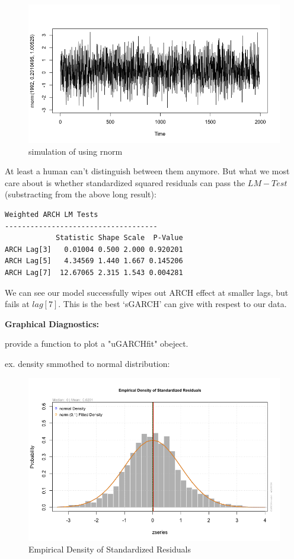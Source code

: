\documentclass[a4paper, 11pt]{article}
\begin{document}
\begin{figure}[H]
\centering
\caption{simulation of using rnorm}
\includegraphics[scale=.40]{rnorm.png}
\end{figure}

\indent At least a human can't distinguish between them anymore. But what we most care about is whether standardized squared residuals can pass the $LM-Test$(substracting from the above long result):

\begin{verbatim}
Weighted ARCH LM Tests
------------------------------------
            Statistic Shape Scale  P-Value
ARCH Lag[3]   0.01004 0.500 2.000 0.920201
ARCH Lag[5]   4.34569 1.440 1.667 0.145206
ARCH Lag[7]  12.67065 2.315 1.543 0.004281
\end{verbatim}

We can see our model successfully wipes out ARCH effect at smaller lags, but fails at $lag[7]$. This is the best `sGARCH' can give with respest to our data.


\textbf{Graphical Diagnostics:}\par
{} provide a function to plot a "uGARCHfit" obeject.\par
ex. density smmothed to normal distribution:
\begin{figure}[H]
\centering
\caption{Empirical Density of Standardized Residuals}
\includegraphics[scale=.60]{density.png}
\end{figure}
 
\end{document}
